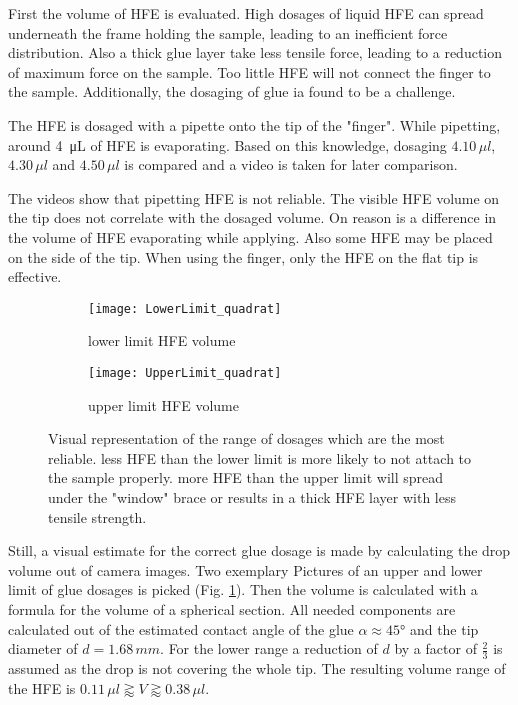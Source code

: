 First the volume of HFE is evaluated. High dosages of liquid HFE can spread underneath the frame holding the sample, leading to an inefficient force distribution. Also a thick glue layer take less tensile force, leading to a reduction of maximum force on the sample. Too little HFE will not connect the finger to the sample. Additionally, the dosaging of glue ia found to be a challenge.

The HFE is dosaged with a pipette onto the tip of the "finger". While pipetting, around \SI{4}{\micro\liter} of HFE is evaporating. Based on this knowledge, dosaging $4.10\,\mu l$, $4.30\,\mu l$ and $4.50\,\mu l$ is compared and a video is taken for later comparison.

The videos show that pipetting HFE is not reliable. The visible HFE volume on the tip does not correlate with the dosaged volume. On reason is a difference in the volume of HFE evaporating while applying. Also some HFE may be placed on the side of the tip. When using the finger, only the HFE on the flat tip is effective.

\begin{figure}[hbt!]
	\centering
	\begin{subfigure}[]{0.45\textwidth}
		\centering
		\texttt{[image: LowerLimit\_quadrat]}
		\caption{lower limit HFE volume}
	\end{subfigure}
	\begin{subfigure}[]{0.45\textwidth}
		\centering
		\texttt{[image: UpperLimit\_quadrat]}
		\caption{upper limit HFE volume}
	\end{subfigure}
	\caption{Visual representation of the range of dosages which are the most reliable. less HFE than the lower limit is more likely to not attach to the sample properly. more HFE than the upper limit will spread under the "window" brace or results in a thick HFE layer with less tensile strength.}
	\label{fig:rangeHFE}
\end{figure}

Still, a visual estimate for the correct glue dosage is made by calculating the drop volume out of camera images. Two exemplary Pictures of an upper and lower limit of glue dosages is picked (Fig. \ref{fig:rangeHFE}). Then the volume is calculated with a formula for the volume of a spherical section. All needed components are calculated out of the estimated contact angle of the glue $\alpha \approx 45°$ and the tip diameter of $d = 1.68\,mm$. For the lower range a reduction of $d$ by a factor of $\frac{2}{3}$ is assumed as the drop is not covering the whole tip. The resulting volume range of the HFE is $ 0.11\,\mu l \gtrapprox V \gtrapprox 0.38\,\mu l $.

